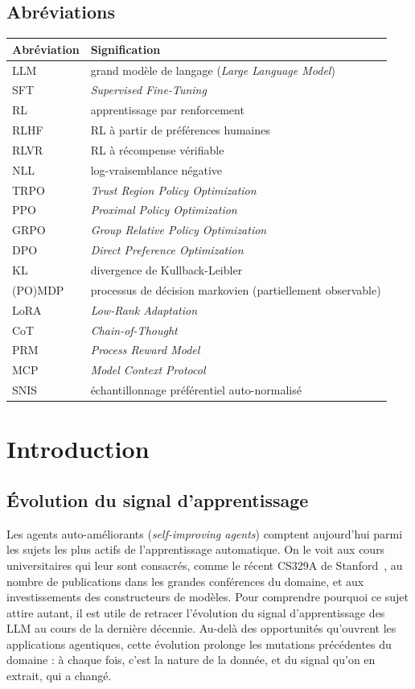 \documentclass[11pt,a4paper]{article}
\begin{document}
\subsection*{Abréviations}
\begin{tabular}{ll}
\toprule
Abréviation & Signification \\
\midrule
LLM & grand modèle de langage (\emph{Large Language Model}) \\
SFT & \emph{Supervised Fine-Tuning} \\
RL & apprentissage par renforcement \\
RLHF & RL à partir de préférences humaines \\
RLVR & RL à récompense vérifiable \\
NLL & log-vraisemblance négative \\
TRPO & \emph{Trust Region Policy Optimization} \\
PPO & \emph{Proximal Policy Optimization} \\
GRPO & \emph{Group Relative Policy Optimization} \\
DPO & \emph{Direct Preference Optimization} \\
KL & divergence de Kullback-Leibler \\
(PO)MDP & processus de décision markovien (partiellement observable) \\
LoRA & \emph{Low-Rank Adaptation} \\
CoT & \emph{Chain-of-Thought} \\
PRM & \emph{Process Reward Model} \\
MCP & \emph{Model Context Protocol} \\
SNIS & échantillonnage préférentiel auto-normalisé \\
\bottomrule
\end{tabular}



\newpage




\section{Introduction}

\subsection{Évolution du signal d'apprentissage}

Les agents auto-améliorants (\emph{self-improving agents}) comptent aujourd'hui parmi les sujets les plus actifs de l'apprentissage automatique. On le voit aux cours universitaires qui leur sont consacrés, comme le récent CS329A de Stanford~\cite{cs329a}, au nombre de publications dans les grandes conférences du domaine, et aux investissements des constructeurs de modèles. Pour comprendre pourquoi ce sujet attire autant, il est utile de retracer l'évolution du signal d'apprentissage des LLM au cours de la dernière décennie. Au-delà des opportunités qu'ouvrent les applications agentiques, cette évolution prolonge les mutations précédentes du domaine : à chaque fois, c'est la nature de la donnée, et du signal qu'on en extrait, qui a changé.
\end{document}
